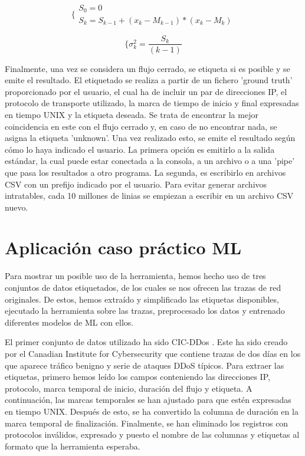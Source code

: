 \documentclass[10pt,a4paper,twoside]{article}
\begin{document}
\begin{multicols}{2}
    \begin{equation} \label{eq:sqrrec}
    \biggl\{
        \begin{array}{l}
            S_{0} = 0 \\
            S_{k} = S_{k-1} + ( x_{k} - M_{k-1} ) * ( x_{k} - M_{k} )
        \end{array}      
    \end{equation}
    
    \begin{equation} \label{eq:variancereq}
    \biggl\{
        \sigma^2_{k} = {\frac{S_{k}}{(k - 1)}}
    \end{equation}

    Finalmente, una vez se considera un flujo cerrado, se etiqueta si es posible y se emite el resultado. El etiquetado se realiza a partir de un fichero 'ground truth' proporcionado por el usuario, el cual ha de incluir un par de direcciones IP, el protocolo de transporte utilizado, la marca de tiempo de inicio y final expresadas en tiempo UNIX y la etiqueta deseada. Se trata de encontrar la mejor coincidencia en este con el flujo cerrado y, en caso de no encontrar nada, se asigna la etiqueta 'unknown'. Una vez realizado esto, se emite el resultado según cómo lo haya indicado el usuario. La primera opción es emitirlo a la salida estándar, la cual puede estar conectada a la consola, a un archivo o a una 'pipe' que pasa los resultados a otro programa. La segunda, es escribirlo en archivos CSV con un prefijo indicado por el usuario. Para evitar generar archivos intratables, cada 10 millones de linias se empiezan a escribir en un archivo CSV nuevo.

    \section{Aplicación caso práctico ML} \label{casoml}

    Para mostrar un posible uso de la herramienta, hemos hecho uso de tres conjuntos de datos etiquetados, de los cuales se nos ofrecen las trazas de red originales. De estos, hemos extraído y simplificado las etiquetas disponibles, ejecutado la herramienta sobre las trazas, preprocesado los datos y entrenado diferentes modelos de ML con ellos. 

    El primer conjunto de datos utilizado ha sido CIC-DDos \cite{8888419}. Este ha sido creado por el Canadian Institute for Cybersecurity que contiene trazas de dos días en los que aparece tráfico benigno y serie de ataques DDoS típicos. Para extraer las etiquetas, primero hemos leído los campos conteniendo las direcciones IP, protocolo, marca temporal de inicio, duración del flujo y etiqueta. A continuación, las marcas temporales se han ajustado para que estén expresadas en tiempo UNIX. Después de esto, se ha convertido la columna de duración en la marca temporal de finalización. Finalmente, se han eliminado los registros con protocolos inválidos, expresado y puesto el nombre de las columnas y etiquetas al formato que la herramienta esperaba.
    

\end{multicols}
\end{document}
